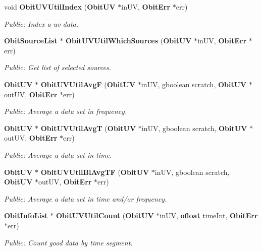 \begin{CompactItemize}
void {\bf Obit\-UVUtil\-Index} ({\bf Obit\-UV} $\ast$in\-UV, {\bf Obit\-Err} $\ast$err)
\begin{CompactList}\small\item\em Public: Index a uv data. \item\end{CompactList}\item 
{\bf Obit\-Source\-List} $\ast$ {\bf Obit\-UVUtil\-Which\-Sources} ({\bf Obit\-UV} $\ast$in\-UV, {\bf Obit\-Err} $\ast$err)
\begin{CompactList}\small\item\em Public: Get list of selected sources. \item\end{CompactList}\item 
{\bf Obit\-UV} $\ast$ {\bf Obit\-UVUtil\-Avg\-F} ({\bf Obit\-UV} $\ast$in\-UV, gboolean scratch, {\bf Obit\-UV} $\ast$out\-UV, {\bf Obit\-Err} $\ast$err)
\begin{CompactList}\small\item\em Public: Average a data set in frequency. \item\end{CompactList}\item 
{\bf Obit\-UV} $\ast$ {\bf Obit\-UVUtil\-Avg\-T} ({\bf Obit\-UV} $\ast$in\-UV, gboolean scratch, {\bf Obit\-UV} $\ast$out\-UV, {\bf Obit\-Err} $\ast$err)
\begin{CompactList}\small\item\em Public: Average a data set in time. \item\end{CompactList}\item 
{\bf Obit\-UV} $\ast$ {\bf Obit\-UVUtil\-Bl\-Avg\-TF} ({\bf Obit\-UV} $\ast$in\-UV, gboolean scratch, {\bf Obit\-UV} $\ast$out\-UV, {\bf Obit\-Err} $\ast$err)
\begin{CompactList}\small\item\em Public: Average a data set in time and/or frequency. \item\end{CompactList}\item 
{\bf Obit\-Info\-List} $\ast$ {\bf Obit\-UVUtil\-Count} ({\bf Obit\-UV} $\ast$in\-UV, {\bf ofloat} time\-Int, {\bf Obit\-Err} $\ast$err)
\begin{CompactList}\small\item\em Public: Count good data by time segment. \item\end{CompactList}\item 

\end{CompactItemize}
